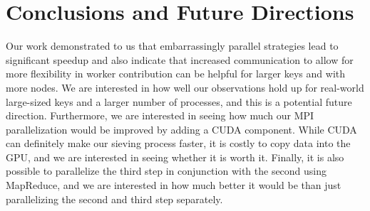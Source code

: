 \documentclass[11pt,twocolumn]{article}
\begin{document}
\section{Conclusions and Future Directions}\label{conc}
Our work demonstrated to us that embarrassingly parallel strategies lead to significant speedup and also indicate that increased communication to allow for more flexibility in worker contribution can be helpful for larger keys and with more nodes. We are interested in how well our observations hold up for real-world large-sized keys and a larger number of processes, and this is a potential future direction. Furthermore, we are interested in seeing how much our MPI parallelization would be improved by adding a CUDA component. While CUDA can definitely make our sieving process faster, it is costly to copy data into the GPU, and we are interested in seeing whether it is worth it. Finally, it is also possible to parallelize the third step in conjunction with the second using MapReduce, and we are interested in how much better it would be than just parallelizing the second and third step separately.
\end{document}

